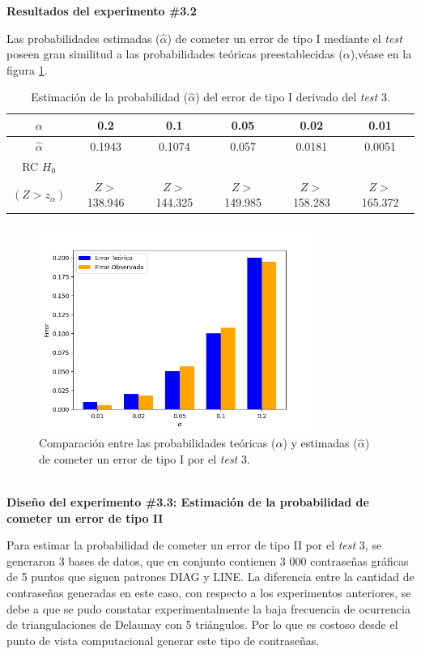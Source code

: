 \documentclass[12pt]{report}
\begin{document}
\textbf{Resultados del experimento \#3.2}

Las probabilidades estimadas ($\hat{\alpha}$) de cometer un error de tipo I  mediante el \textit{test} poseen gran similitud  a las probabilidades teóricas preestablecidas ($\alpha$),véase en la figura \ref{Teorico vs Observado3}.
\begin{table}[h!]
	\centering
		\caption{Estimación de la probabilidad ($\hat{\alpha}$) del error de tipo I derivado del \textit{test} 3.}
	\begin{tabular}{|c|ccccc|}
		\hline
		$\alpha$ & 0.2 &   0.1 &  0.05 &  0.02 &  0.01 \\
		\hline
		$\hat{\alpha}$ & 0.1943 & 0.1074 & 0.057 & 0.0181 & 0.0051 \\
		\hline
	RC $H_0$ 		&		&		&		&		&\\
		$(Z>z_\alpha)$&  $Z>$138.946& $Z>$144.325& $Z>$149.985& $Z>$158.283& $Z>$165.372\\	
		\hline
	\end{tabular}

	\label{tab3:error1-prob1}
\end{table}
\begin{figure}[ht]
	\centering
	
	\includegraphics[width=0.8\textwidth]{5td_teo_obs.png}
	\caption{Comparación entre las probabilidades teóricas ($\alpha$) y estimadas ($\hat{\alpha}$) de cometer un error de tipo I por el \textit{test} 3. }
	\label{Teorico vs Observado3}
\end{figure}\\

\textbf{Diseño del experimento \#3.3: Estimación de la probabilidad de cometer un error de tipo II}

Para estimar la probabilidad de cometer un error de tipo II por el \textit{test} 3, se generaron 3 bases de datos, que en conjunto contienen 3 000 contraseñas gráficas de 5 puntos que siguen patrones DIAG y LINE. La diferencia entre la cantidad de contraseñas generadas en este caso, con respecto a los experimentos anteriores, se debe a que se pudo constatar experimentalmente la baja frecuencia de ocurrencia de triangulaciones de Delaunay con 5 triángulos. Por lo que es costoso desde el punto de vista computacional generar este tipo de contraseñas.
\end{document}
